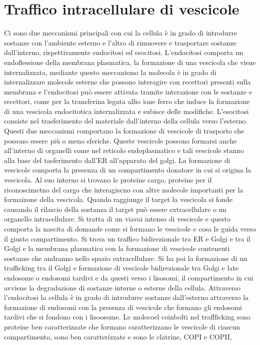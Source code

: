 \section{Traffico intracellulare di vescicole}
Ci sono due meccanismi principali con cui la cellula \`e in grado di introdurre sostanze con l'ambiente esterno e l'altro di rimuovere e trasportare sostanze dall'interno, rispettivamente
endocitosi ed esocitosi. L'endocitosi comporta un endoflessione della membrana plasmatica, la formazione di una vescicola che viene internalizzata, mediante questo meccanismo la
molecola \`e in grado di internalizzare molecole esterne che possono interagire con recettori presenti sulla membrana e l'endocitosi pu\`o essere attivata tramite interazione con 
le sostanze e recettori, come per la transferina legata allio ione ferro che induce la formazione di una vescicola endocitotica internalizzata e subisce delle modifiche. L'esocitosi
consiste nel trasferimento del materiale dall'interno della cellula verso l'esterno. Questi due meccanismi comportano la formazione di vescicole di trasporto che possono essere pi\`u 
o meno sferiche. Queste vescicole possono formarsi anche all'interno di organelli come nel reticolo endoplasmatico e tali vescicole stanno alla base del tasferimento dall'ER all'apparato 
del golgi. La formazione di vescicole comporta la presenza di un compartimento donatore in cui si origina la vescicola. Al suo interno si trovano le proteine cargo, proteine per il 
riconoscimetno del cargo che interagiscno con altre molecole importanti per la formaizone della vescicola. Quando raggiunge il target la vescicola si fonde causando il rilascio della 
sostanza il target pu\`o essere extracellulare o un organello intracellulare. Si tratta di un viavai intenso di vescicole e questo comporta la nascita di domande come si formano le 
vescicole e cosa le guida verso il giusto compartimento. Si trova un traffico bidirezionale tra ER e Golgi e tra il Golgi e la membrana plasmatica con la formazione di vescicole 
contenenti sostanze che andranno nello spazio extracellulare. Si ha poi la formazione di un trafficking tra il Golgi e formazione di vescicole bidirezionale tra Golgi e late endosome o 
endosomi tardivi e da questi verso i lisosomi, il compartimento in cui avviene la degradazione di sostanze interne o esterne della cellula. Attraverso l'endocitosi la cellula \`e in 
grado di introdurre sostanze dall'esterno attraverso la formazione di endosomi con la presenza di vescicole che formano gli endosomi tardivi che si fondono con i lisoosome. Le molecoel
coinbolti nel traffficking sono proteine ben caratterizzate che formano caratterizzano le vescicole di ciascun compartimento, sono ben caratterizzate e sono le clatrine, COPI e COPII, 
